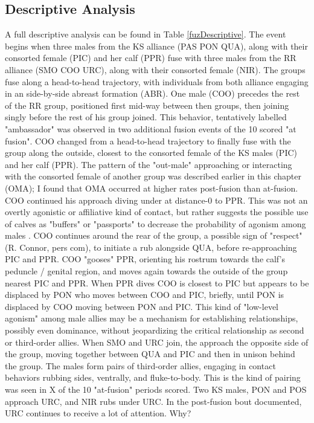 \documentclass[11pt]{amsart}
\begin{document}
\subsection{Descriptive Analysis}

A full descriptive analysis can be found in Table \ref{fuzDescriptive}. The event begins when three males from the KS alliance (PAS PON QUA), along with their consorted female (PIC) and her calf (PPR) fuse with three males from the RR alliance (SMO COO URC), along with their consorted female (NIR). The groups fuse along a head-to-head trajectory, with individuals from both alliance engaging in an side-by-side abreast formation (ABR). One male (COO) precedes the rest of the RR group, positioned first mid-way between then groups, then joining singly before the rest of his group joined. This behavior, tentatively labelled "ambassador" was observed in two additional fusion events of the 10 scored "at fusion". COO changed from a head-to-head trajectory to finally fuse with the group along the outside, closest to the consorted female of the KS males (PIC) and her calf (PPR). The pattern of the "out-male" approaching or interacting with the consorted female of another group was described earlier in this chapter (OMA); I found that OMA occurred at higher rates post-fusion than at-fusion. COO continued his approach diving under at distance-0 to PPR. This was not an overtly agonistic or affiliative kind of contact, but rather suggests the possible use of calves as "buffers" or "passports" to decrease the probability of agonism among males \citep[e.g.][]{itani:1959, hrdy:1976, silk:1984}. COO continues around the rear of the group, a possible sign of "respect" (R. Connor, pers com), to initiate a rub alongside QUA, before re-approaching PIC and PPR. COO "gooses" PPR, orienting his rostrum towards the calf's peduncle / genital region, and moves again towards the outside of the group nearest PIC and PPR. When PPR dives COO is closest to PIC but appears to be displaced by PON who moves between COO and PIC, briefly, until PON is displaced by COO moving between PON and PIC. This kind of "low-level agonism" among male allies may be a mechanism for establishing relationships, possibly even dominance, without jeopardizing the critical relationship as second or third-order allies. When SMO and URC join, the approach the opposite side of the group, moving together between QUA and PIC and then in unison behind the group. The males form pairs of third-order allies, engaging in contact behaviors rubbing sides, ventrally, and fluke-to-body. This is the kind of pairing was seen in X of the 10 "at-fusion" periods scored. Two KS males, PON and POS approach URC, and NIR rubs under URC. In the post-fusion bout documented, URC continues to receive a lot of attention. Why?
\end{document}
